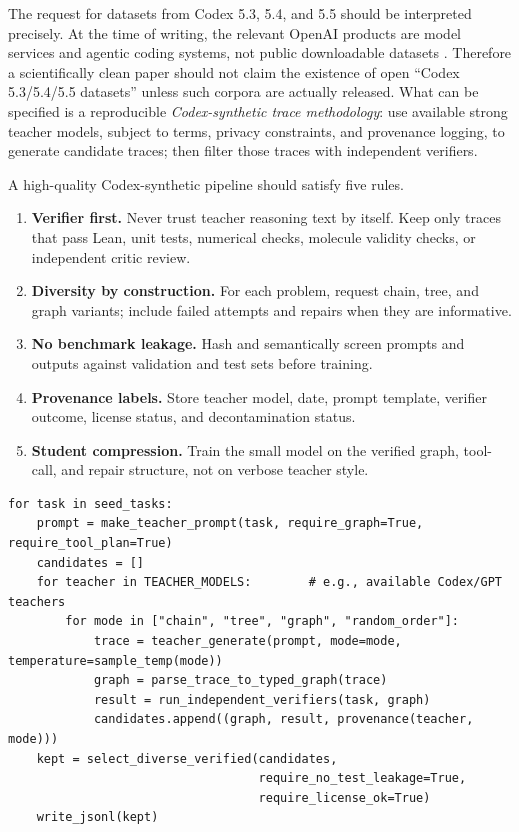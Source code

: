 \documentclass[11pt]{article}
\newcommand{\1}{\mathbf{1}}
\begin{document}
The request for datasets from Codex 5.3, 5.4, and 5.5 should be interpreted precisely. At the time of writing, the relevant OpenAI products are model services and agentic coding systems, not public downloadable datasets \cite{OpenAICodexModels2026,OpenAIGPT55}. Therefore a scientifically clean paper should not claim the existence of open ``Codex 5.3/5.4/5.5 datasets'' unless such corpora are actually released. What can be specified is a reproducible \emph{Codex-synthetic trace methodology}: use available strong teacher models, subject to terms, privacy constraints, and provenance logging, to generate candidate traces; then filter those traces with independent verifiers.

A high-quality Codex-synthetic pipeline should satisfy five rules.

\begin{enumerate}
\item \textbf{Verifier first.} Never trust teacher reasoning text by itself. Keep only traces that pass Lean, unit tests, numerical checks, molecule validity checks, or independent critic review.
\item \textbf{Diversity by construction.} For each problem, request chain, tree, and graph variants; include failed attempts and repairs when they are informative.
\item \textbf{No benchmark leakage.} Hash and semantically screen prompts and outputs against validation and test sets before training.
\item \textbf{Provenance labels.} Store teacher model, date, prompt template, verifier outcome, license status, and decontamination status.
\item \textbf{Student compression.} Train the small model on the verified graph, tool-call, and repair structure, not on verbose teacher style.
\end{enumerate}

\begin{lstlisting}[caption={Codex-synthetic trace generation with independent verification.}]
for task in seed_tasks:
    prompt = make_teacher_prompt(task, require_graph=True, require_tool_plan=True)
    candidates = []
    for teacher in TEACHER_MODELS:        # e.g., available Codex/GPT teachers
        for mode in ["chain", "tree", "graph", "random_order"]:
            trace = teacher_generate(prompt, mode=mode, temperature=sample_temp(mode))
            graph = parse_trace_to_typed_graph(trace)
            result = run_independent_verifiers(task, graph)
            candidates.append((graph, result, provenance(teacher, mode)))
    kept = select_diverse_verified(candidates,
                                   require_no_test_leakage=True,
                                   require_license_ok=True)
    write_jsonl(kept)
\end{lstlisting}
\end{document}
